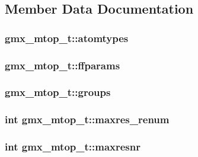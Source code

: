 \subsection{\-Member \-Data \-Documentation}
\hypertarget{structgmx__mtop__t_ae8639ad509d382efc1bbd53868f96fa3}{
\subsubsection[{atomtypes}]{ {\bf gmx\-\_\-mtop\-\_\-t\-::atomtypes}}}\label{structgmx__mtop__t_ae8639ad509d382efc1bbd53868f96fa3}
\hypertarget{structgmx__mtop__t_a4b1d67c93dac557e9c7ef38aa45ecde0}{
\subsubsection[{ffparams}]{ {\bf gmx\-\_\-mtop\-\_\-t\-::ffparams}}}\label{structgmx__mtop__t_a4b1d67c93dac557e9c7ef38aa45ecde0}
\hypertarget{structgmx__mtop__t_aaade49c94099ff7de3ea2d5f108041d6}{
\subsubsection[{groups}]{ {\bf gmx\-\_\-mtop\-\_\-t\-::groups}}}\label{structgmx__mtop__t_aaade49c94099ff7de3ea2d5f108041d6}
\hypertarget{structgmx__mtop__t_ad126499e230240338604ba42b0092ef7}{
\subsubsection[{maxres\-\_\-renum}]{\setlength{\rightskip}{0pt plus 5cm}int {\bf gmx\-\_\-mtop\-\_\-t\-::maxres\-\_\-renum}}}\label{structgmx__mtop__t_ad126499e230240338604ba42b0092ef7}
\hypertarget{structgmx__mtop__t_a87b58a763d5664f5bfae662fc4bd183a}{
\subsubsection[{maxresnr}]{\setlength{\rightskip}{0pt plus 5cm}int {\bf gmx\-\_\-mtop\-\_\-t\-::maxresnr}}}\label{structgmx__mtop__t_a87b58a763d5664f5bfae662fc4bd183a}
